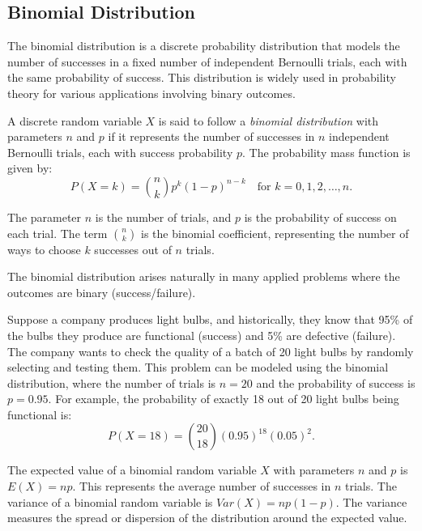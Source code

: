 %
%

\subsection{Binomial Distribution}

The binomial distribution is a discrete probability distribution that models the number of successes in a fixed number of independent Bernoulli trials, each with the same probability of success. This distribution is widely used in probability theory for various applications involving binary outcomes.

\begin{definition}
\label{def:binomial_distribution}
A discrete random variable $X$ is said to follow a \emph{binomial distribution} with parameters $n$ and $p$ if it represents the number of successes in $n$ independent Bernoulli trials, each with success probability $p$. The probability mass function is given by:
\[
P(X = k) = \binom{n}{k} p^k (1 - p)^{n - k} \quad \text{for } k = 0, 1, 2, \ldots, n.
\]
\end{definition}

The parameter $n$ is the number of trials, and $p$ is the probability of success on each trial. The term $\binom{n}{k}$ is the binomial coefficient, representing the number of ways to choose $k$ successes out of $n$ trials.

The binomial distribution arises naturally in many applied problems where the outcomes are binary (success/failure).

\begin{example}
Suppose a company produces light bulbs, and historically, they know that 95\% of the bulbs they produce are functional (success) and 5\% are defective (failure). The company wants to check the quality of a batch of 20 light bulbs by randomly selecting and testing them. This problem can be modeled using the binomial distribution, where the number of trials is $n = 20$ and the probability of success is $p = 0.95$. For example, the probability of exactly 18 out of 20 light bulbs being functional is:
\[
P(X = 18) = \binom{20}{18} (0.95)^{18} (0.05)^2.
\]
\end{example}

The expected value of a binomial random variable $X$ with parameters $n$ and $p$ is $E(X) = np$. This represents the average number of successes in $n$ trials. The variance of a binomial random variable is $Var(X) = np(1 - p)$. The variance measures the spread or dispersion of the distribution around the expected value.

